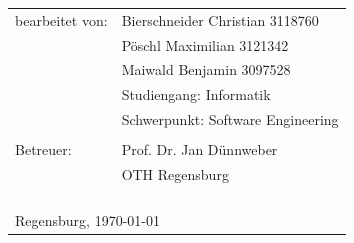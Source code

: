 \begin{small}
\begin{tabular}{ll}
bearbeitet von:\hspace{1cm} & Bierschneider Christian \hspace{0.5cm}3118760 \tabularnewline
 & Pöschl Maximilian \hspace{1.27cm}3121342 \tabularnewline
 & Maiwald Benjamin \hspace{1.25cm}3097528 \tabularnewline
 & Studiengang: Informatik \tabularnewline
 & Schwerpunkt: Software Engineering \tabularnewline
 & \tabularnewline

 
Betreuer: & Prof. Dr. Jan Dünnweber \tabularnewline
 & OTH Regensburg\tabularnewline
 & \tabularnewline
 & \tabularnewline
 & \tabularnewline
  & \tabularnewline
\multicolumn{2}{l}{Regensburg, \today}\tabularnewline
\end{tabular}
\end{small}